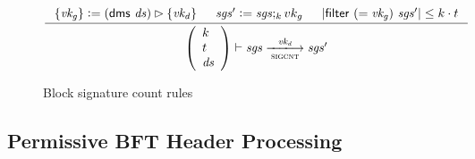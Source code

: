 \documentclass[11pt,a4paper]{article}
\newcommand{\restrictrange}{\rhd}
\newcommand{\var}[1]{\mathit{#1}}
\newcommand{\fun}[1]{\mathsf{#1}}
\newcommand{\type}[1]{\mathsf{#1}}
\newcommand{\size}[1]{\left| #1 \right|}
\newcommand{\trans}[2]{\xlongrightarrow[\textsc{#1}]{#2}}
\newcommand{\leteq}{\ensuremath{\mathrel{\mathop:}=}}
\begin{document}
\begin{figure}[ht]
  \begin{equation*}
    \inference
    {
      \{\var{vk_g}\} \leteq (\fun{dms} ~ \var{ds}) \restrictrange \{\var{vk_d}\}
      & \var{sgs'} \leteq \var{sgs};_k {vk_g} &
      \size{\fun{filter}~(=\var{vk_g})~\var{sgs'}} \leq k \cdot t \\
    }
    {
      \left(
        {\begin{array}{l}
           k\\
           t\\
           \var{ds}
         \end{array}}
     \right)
     \vdash
     {\var{sgs}}
     \trans{sigcnt}{\var{vk_d}}
     {\var{sgs'}}
   }
   \label{eq:rule:sigcnt}
 \end{equation*}
 \caption{Block signature count rules}
 \label{fig:rules:sigcnt}
\end{figure}

\clearpage

\subsection{Permissive BFT Header Processing}

\newcommand{\PBFTEnv}{\type{PBFTEnv}}
\newcommand{\PBFTState}{\type{PBFTState}}

\newcommand{\Bhead}{\type{BlockHeader}}
\newcommand{\Bhtosign}{\type{BHToSign}}

\newcommand{\bhslotname}{bhSlot}
\newcommand{\bhslot}[1]{\fun{\bhslotname}\ #1}
\newcommand{\bhhashname}{bhHash}
\newcommand{\bhhash}[1]{\fun{\bhhashname}\ #1}
\newcommand{\bhprevhashname}{bhPrevHash}
\newcommand{\bhprevhash}[1]{\fun{\bhprevhashname}\ #1}
\newcommand{\bhtosignname}{bhToSign}
\newcommand{\bhtosign}[1]{\fun{\bhtosignname}\ #1}
\end{document}
